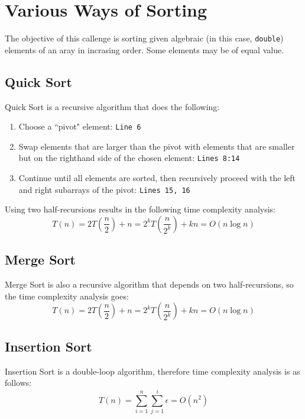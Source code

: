 \chapter{Various Ways of Sorting}
The objective of this callenge is sorting given algebraic (in this case,
\texttt{double}) elements of an aray in incrasing order. Some elements may be of
equal value.

\section{Quick Sort}
Quick Sort is a recursive algorithm that does the following:
\begin{enumerate}
\item Choose a ``pivot" element: \texttt{Line 6}
\item Swap elements that are larger than the pivot with elements that are
    smaller but on the righthand side of the chosen element: \texttt{Lines 8:14}
\item Continue until all elements are sorted, then recursively proceed with the
    left and right subarrays of the pivot: \texttt{Lines 15, 16}
\end{enumerate}
Using two half-recursions results in the following time complexity analysis: \[
T(n)=2T\left(\frac{n}{2}\right)+n=2^kT\left(\frac{n}{2^k}\right)+kn=O(n\log n)\]

\section{Merge Sort}
Merge Sort is also a recursive algorithm that depends on two half-recursions, so
the time complexity analysis goes: \[ T(n)=2T\left(\frac{n}{2}\right)+n=
2^kT\left(\frac{n}{2^k}\right)+kn=O(n\log n) \]

\section{Insertion Sort}
Insertion Sort is a double-loop algorithm, therefore time complexity analysis is
as follows: \[ T(n)=\sum_{i=1}^n\sum_{j=1}^i\epsilon=O(n^2) \]

